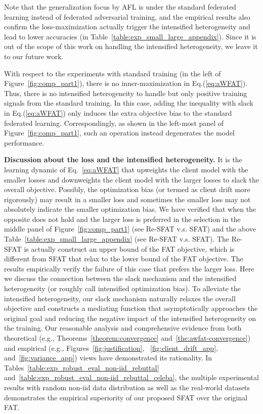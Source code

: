\documentclass{article} %
\theoremstyle{plain}
\theoremstyle{definition}
\theoremstyle{remark}
\begin{document}
Note that the generalization focus by AFL is under the standard federated learning instead of federated adversarial training, and the empirical results also confirm the loss-maximization actually trigger the intensified heterogeneity and lead to lower accuracies (in Table~\ref{table:exp_small_large_appendix}). Since it is out of the scope of this work on handling the intensified heterogeneity, we leave it to our future work.

With respect to the experiments with standard training (in the left of Figure~\ref{fig:comp_part1}), there is no inner-maximization in Eq.(\ref{eq:aWFAT}). Thus, there is no intensified heterogeneity to handle but only positive training signals from the standard training. In this case, adding the inequality with slack in Eq.(\ref{eq:aWFAT}) only induces the extra objective bias to the standard federated learning. Correspondingly, as shown in the left-most panel of Figure~\ref{fig:comp_part1}, such an operation instead degenerates the model performance.

\textbf{Discussion about the loss and the intensified heterogeneity. } It is the learning dynamic of Eq.~\ref{eq:aWFAT} that upweights the client model with the smaller losses and downweights the client model with the larger losses to slack the overall objective. Possibly, the optimization bias (or termed as client drift more rigorously) may result in a smaller loss and sometimes the smaller loss may not absolutely indicate the smaller optimization bias. We have verified that when the opposite does not hold and the larger loss is preferred in the selection in the middle panel of Figure~\ref{fig:comp_part1} (see Re-SFAT v.s. SFAT) and the above Table~\ref{table:exp_small_large_appendix} (see Re-SFAT v.s. SFAT). The Re-SFAT is actually construct an upper bound of the FAT objective, which is different from SFAT that relax to the lower bound of the FAT objective. The results empirically verify the failure of this case that prefers the larger loss. Here we discuss the connection between the slack mechanism and the intensified heterogeneity (or roughly call intensified optimization bias). To alleviate the intensified heterogeneity, our slack mechanism naturally relaxes the overall objective and constructs a mediating function that asymptotically approaches the original goal and reducing the negative impact of the intensified heterogeneity on the training. Our reasonable analysis and comprehensive evidence from both theoretical (e.g., Theorems~\ref{theorem:convergence} and~\ref{the:awfat-convergence}) and empirical (e.g., Figures~\ref{fig:justification}, ~\ref{fig:client_drift_app}, and~\ref{fig:variance_app}) views have demonstrated its rationality. In Tables~\ref{table:exp_robust_eval_non-iid_rebuttal} and~\ref{table:exp_robust_eval_non-iid_rebuttal_celeba}, the multiple experimental results with random non-iid data distribution as well as the real-world datasets demonstrates the empirical superiority of our proposed SFAT over the original FAT.
\end{document}
